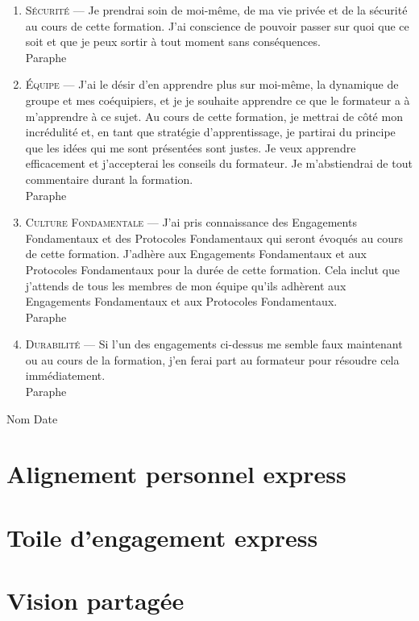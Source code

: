 \documentclass[11pt]{book}
\let\oldsection\section
\renewcommand\section{\clearpage\oldsection}
\begin{document}
\begin{enumerate}
	\item \textsc{Sécurité} --- Je prendrai soin de moi-même, de ma vie privée et de la sécurité au cours de cette formation. J'ai conscience de pouvoir passer sur quoi 
	      que ce soit et que je peux sortir à tout moment sans conséquences.\\\nobreak
	      Paraphe  \dotfill
	\item \textsc{Équipe} --- J'ai le désir d'en apprendre plus sur moi-même, la dynamique de groupe et mes coéquipiers, et je je souhaite apprendre ce que
	      le formateur a à m'apprendre à ce sujet. Au cours de cette formation, je mettrai de côté mon incrédulité et, en tant que stratégie d'apprentissage, 
	      je partirai du principe que les idées qui me sont présentées sont justes. Je veux apprendre efficacement et j'accepterai les conseils du formateur. 
	      Je m'abstiendrai de tout commentaire durant la formation.\\\nobreak
	      Paraphe  \dotfill
	\item \textsc{Culture Fondamentale} --- J'ai pris connaissance des Engagements Fondamentaux et des Protocoles Fondamentaux qui seront évoqués au cours
	      de cette formation. J'adhère aux Engagements Fondamentaux et aux Protocoles Fondamentaux pour la durée de cette formation. Cela inclut que j'attends
	      de tous les membres de mon équipe qu'ils adhèrent aux Engagements Fondamentaux et aux Protocoles Fondamentaux.\\\nobreak
	      Paraphe  \dotfill
	\item \textsc{Durabilité} --- Si l'un des engagements ci-dessus me semble faux maintenant ou au cours de la formation, j'en ferai part au formateur
	      pour résoudre cela immédiatement. \\\nobreak
	      Paraphe  \dotfill
\end{enumerate}

Nom \dotfill Date \dotfill

\section{Alignement personnel express} \label{alignement-personnel-express}
\section{Toile d'engagement express} \label{toile-engagement-express}
\section{Vision partagée} \label{vision-partagee}
\end{document}
